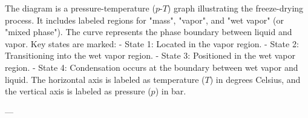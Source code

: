 The diagram is a pressure-temperature (\( p \)-\( T \)) graph illustrating the freeze-drying process. It includes labeled regions for "mass", "vapor", and "wet vapor" (or "mixed phase"). The curve represents the phase boundary between liquid and vapor. Key states are marked:  
- State 1: Located in the vapor region.  
- State 2: Transitioning into the wet vapor region.  
- State 3: Positioned in the wet vapor region.  
- State 4: Condensation occurs at the boundary between wet vapor and liquid.  
The horizontal axis is labeled as temperature (\( T \)) in degrees Celsius, and the vertical axis is labeled as pressure (\( p \)) in bar.

---